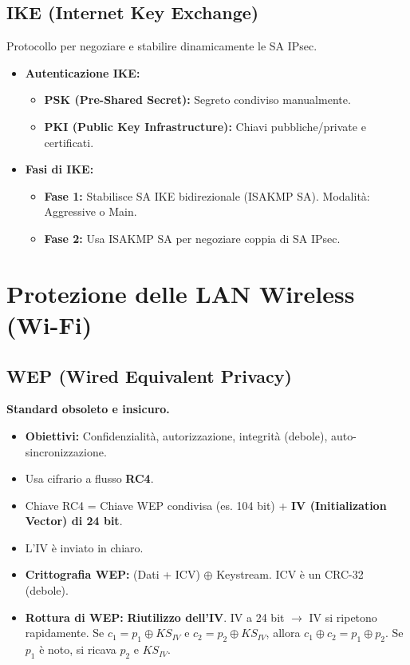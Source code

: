 \documentclass{article}
\begin{document}
\begin{enumerate}
\subsection{IKE (Internet Key Exchange)}
Protocollo per negoziare e stabilire dinamicamente le SA IPsec.
\begin{itemize}
    \item \textbf{Autenticazione IKE:}
    \begin{itemize}
        \item \textbf{PSK (Pre-Shared Secret):} Segreto condiviso manualmente.
        \item \textbf{PKI (Public Key Infrastructure):} Chiavi pubbliche/private e certificati.
    \end{itemize}
    \item \textbf{Fasi di IKE:}
    \begin{itemize}
        \item \textbf{Fase 1:} Stabilisce SA IKE bidirezionale (ISAKMP SA). Modalità: Aggressive o Main.
        \item \textbf{Fase 2:} Usa ISAKMP SA per negoziare coppia di SA IPsec.
    \end{itemize}
\end{itemize}

\section{Protezione delle LAN Wireless (Wi-Fi)}
\label{sec:wifi_security}

\subsection{WEP (Wired Equivalent Privacy)}
\textbf{Standard obsoleto e insicuro.}
\begin{itemize}
    \item \textbf{Obiettivi:} Confidenzialità, autorizzazione, integrità (debole), auto-sincronizzazione.
    \item Usa cifrario a flusso \textbf{RC4}.
    \item Chiave RC4 = Chiave WEP condivisa (es. 104 bit) + \textbf{IV (Initialization Vector) di 24 bit}.
    \item L'IV è inviato in chiaro.
    \item \textbf{Crittografia WEP:} (Dati + ICV) $\oplus$ Keystream. ICV è un CRC-32 (debole).
    \item \textbf{Rottura di WEP:} \textbf{Riutilizzo dell'IV}. IV a 24 bit $\rightarrow$ IV si ripetono rapidamente.
    Se $c_1 = p_1 \oplus KS_{IV}$ e $c_2 = p_2 \oplus KS_{IV}$, allora $c_1 \oplus c_2 = p_1 \oplus p_2$.
    Se $p_1$ è noto, si ricava $p_2$ e $KS_{IV}$.
\end{itemize}


\end{enumerate}
\end{document}
